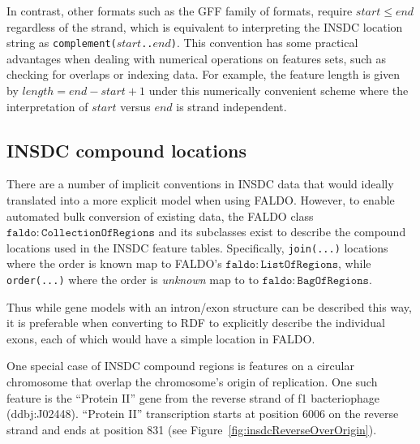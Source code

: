 In contrast, other formats such as the GFF family of formats, require $start \leq end$
regardless of the strand, which is equivalent to interpreting
the INSDC location string as \texttt{complement($start$..$end$)}.
This convention has some practical advantages when
dealing with numerical operations on features sets, such as
checking for overlaps or indexing data. For example, the
feature length is given by $length = end - start + 1$ under
this numerically convenient scheme where the interpretation
of $start$ versus $end$ is strand independent.

\subsection*{INSDC compound locations}

There are a number of implicit conventions in INSDC data that would ideally
translated into a more explicit model when using FALDO.
However, to enable automated bulk conversion of existing data, the FALDO class
$\mathtt{faldo\colon{}CollectionOfRegions}$ and its subclasses exist to describe
the compound locations used in the INSDC feature tables.
Specifically, \texttt{join(...)} locations where the order is known map to FALDO's
$\mathtt{faldo\colon{}ListOfRegions}$, while \texttt{order(...)} where the order is
\emph{unknown} map to to $\mathtt{faldo\colon{}BagOfRegions}$.


Thus while gene models with an intron/exon structure can be described this way,
it is preferable when converting to RDF to explicitly describe the individual exons,
each of which would have a simple location in FALDO.

One special case of INSDC compound regions is features on a circular chromosome
that overlap the chromosome's origin of replication.
One such feature is the ``Protein II'' gene from the reverse strand of f1 bacteriophage (ddbj:J02448).
``Protein II'' transcription starts at position 6006 on the reverse strand and ends at position 831 (see Figure~\ref{fig:insdcReverseOverOrigin}).


